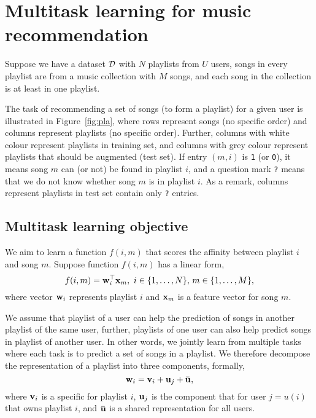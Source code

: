 \section{Multitask learning for music recommendation}
\label{sec:method}

Suppose we have a dataset $\mathcal{D}$ with $N$ playlists from $U$ users, songs in every playlist are from a music collection 
with $M$ songs, and each song in the collection is at least in one playlist.

The task of recommending a set of songs (to form a playlist) for a given user is illustrated in Figure~\ref{fig:pla},
where rows represent songs (no specific order) and columns represent playlists (no specific order).
Further, columns with white colour represent playlists in training set, 
and columns with grey colour represent playlists that should be augmented (\ie test set).
If entry $(m, i)$ is \texttt{1} (or \texttt{0}), 
it means song $m$ can (or not) be found in playlist $i$,
and a question mark \texttt{?} means that we do not know whether song $m$ is in playlist $i$.
As a remark, columns represent playlists in test set contain only \texttt{?} entries.





\subsection{Multitask learning objective}

%
We aim to learn a function $f(i, m)$ that scores the affinity between playlist $i$ and song $m$.
Suppose function $f(i, m)$ has a linear form, \ie
$$
f(i, m) = \mathbf{w}_i^\top \mathbf{x}_m, \ i \in \{1,\dots,N\}, \, m \in \{1,\dots,M\},
$$
where vector $\mathbf{w}_i$ represents playlist $i$ and $\mathbf{x}_m$ is a feature vector for song $m$.

We assume that playlist of a user can help the prediction of songs in another playlist of the same user,
further, playlists of one user can also help predict songs in playlist of another user.
In other words, we jointly learn from multiple tasks where each task is to predict a set of songs in a playlist.
We therefore decompose the representation of a playlist into three components, formally,
$$
\w_i = \bv_i + \bu_j + \widebar\bu,
$$
where $\mathbf{v}_i$ is a specific for playlist $i$, $\mathbf{u}_j$ is the component that for user $j=u(i)$ that owns playlist $i$,
and $\widebar\bu$ is a shared representation for all users.


